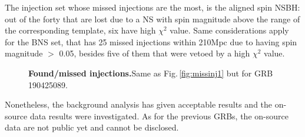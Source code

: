 \documentclass[binding=0.6cm, LaM]{sapthesis}
\begin{document}
        The injection set whose missed injections are the most, is the aligned spin NSBH:
        out of the forty that are lost due to a NS  with  spin magnitude above the range of the corresponding template,
        six have high $\chi^2$ value.
        Same considerations apply for the BNS set, that has 25 missed injections within 210Mpc due to having spin magnitude $>$ 0.05,
        besides five of  them that were vetoed by a high $\chi^2$ value.
                \begin{figure}[!t]
                        \noindent
                        \label{missinj3_5}
                        \centering
                        \caption{\textbf{Found/missed injections.}Same as Fig.\,\ref{fig:missinj1} but for GRB 190425089.}
                        \label{fig:missinj3_5}
                \end{figure}
	Nonetheless, the background analysis has given acceptable results
	and the on-source data results were investigated. 
	As for the previous GRBs, the on-source data are not public yet and cannot be disclosed. 
\end{document}
